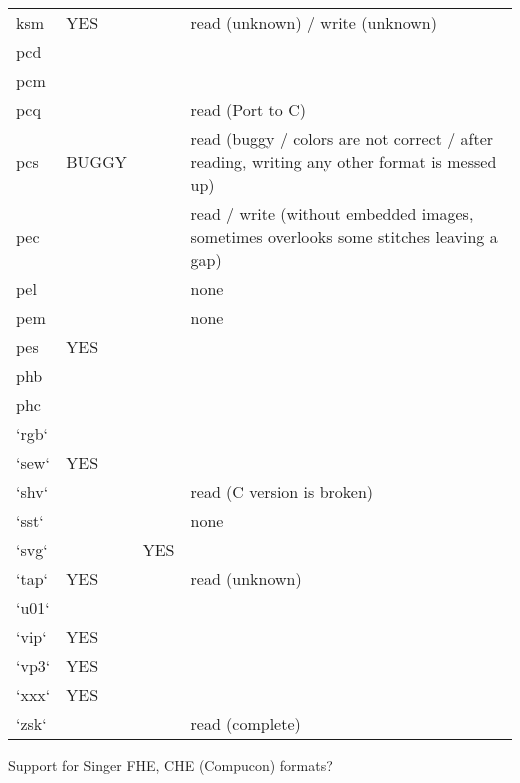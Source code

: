 \begin{longtable}{l l l p{8cm}}
\index{ksm}ksm & YES   &  & read (unknown) / write (unknown) \\
\index{pcd}pcd &  &  &  \\
\index{pcm}pcm &  &  & \\
\index{pcq}pcq &  &  & read (Port to C) \\
\index{pcs}pcs & BUGGY &  & read (buggy / colors are not correct / after reading, writing any other format is messed up) \\
\index{pec}pec &  &  & read / write (without embedded images, sometimes overlooks some stitches leaving a gap) \\
\index{pel}pel &  &  & none \\
\index{pem}pem &  &  & none \\
\index{pes}pes & YES   &  & \\
\index{phb}phb &  &  & \\
\index{phc}phc &  &  & \\
`rgb` &  &  & \\
`sew` & YES   &  & \\
`shv` &  &  & read (C version is broken) \\
`sst` &  &  & none \\
`svg` &  & YES   & \\
`tap` & YES   &  & read (unknown) \\
`u01` &  &  & \\
`vip` & YES   &  & \\
`vp3` & YES   &  & \\
`xxx` & YES   &  & \\
`zsk` &  &  & read (complete)
\end{longtable}

Support for Singer FHE, CHE (Compucon) formats?

